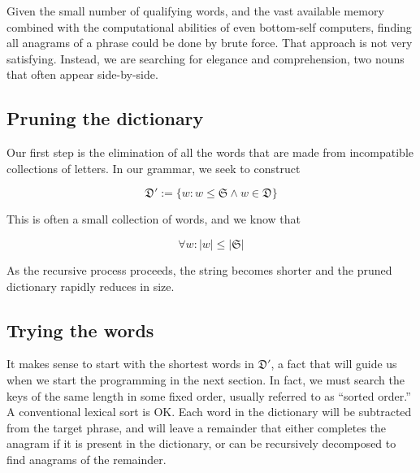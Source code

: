 \documentclass[letterpaper, 11pt]{article}
\newcommand{\D}{$\mathfrak{D}$\xspace}
\newcommand{\Dp}{$\mathfrak{D}'$\xspace}
\begin{document}

Given the small number of qualifying words, and the vast available
memory combined with the computational abilities of even bottom-self
computers, finding all anagrams of a phrase could be done by brute
force. That approach is not very satisfying. Instead, we are searching
for elegance and comprehension, two nouns that often appear
side-by-side.

\subsection{Pruning the dictionary}

Our first step is the elimination of all the words that are made
from incompatible collections of letters. In our grammar, we seek
to construct

\begin{equation}
\label{eq:deriveddictionaries}
\mathfrak{D}' := \{w:w \leq \mathfrak{S} \wedge w \in \mathfrak{D}\}
\end{equation}

This is often a small collection of words, and we know that 

\begin{equation}
\label{eq:wordlength}
\forall w: |w| \leq |\mathfrak{S}|
\end{equation}

As the recursive process proceeds, the string becomes shorter
and the pruned dictionary rapidly reduces in size.

\subsection{Trying the words}

It makes sense to start with the shortest words in \Dp, a fact that
will guide us when we start the programming in the next section.
In fact, we must search the keys of the same length in some fixed
order, usually referred to as ``sorted order.'' A conventional
lexical sort is OK.  Each word in the dictionary will be subtracted
from the target phrase, and will leave a remainder that either
completes the anagram if it is present in the dictionary, or can
be recursively decomposed to find anagrams of the remainder.
\end{document}
